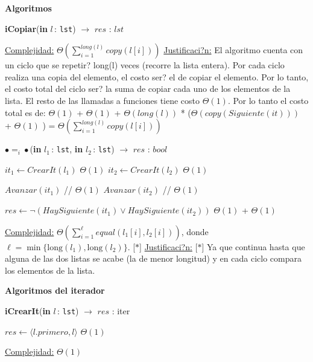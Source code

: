 \documentclass[a4paper,10pt]{article}
\let\TipoVariable=\texttt
\let\ModificadorArgumento=\textbf
\newcommand{\In}[2]{\ModificadorArgumento{in} \ensuremath{#1}\,: \TipoVariable{#2}\xspace}
\newenvironment{Algoritmos}{%
  \vspace*{2ex}%
  \noindent\textbf{\Large Algoritmos}%
  \vspace*{2ex}%
}{}
\newcommand{\Titulo}[1]{
  \vspace*{1ex}\par\noindent\textbf{\large #1}\par
}
\begin{document}
\begin{Algoritmos}
\begin{algorithm}[H]{\textbf{iCopiar}(\In{l}{lst}) $\to$ $res$ : $lst$}
\begin{algorithmic}[1]
		\medskip
		\Statex \underline{Complejidad:} $\Theta\left(\sum_{i=1}^{long(l)}copy({l[i]})\right)$
		\Statex \underline{Justificaci?n:} El algoritmo cuenta con un ciclo que se repetir? long(l) veces (recorre la lista entera). Por cada ciclo realiza una copia del elemento, el costo ser? el de copiar el elemento. Por lo tanto, el costo total del ciclo ser? la suma de copiar cada uno de los elementos de la lista. El resto de las llamadas a funciones tiene costo $\Theta(1)$. Por lo tanto el costo total es de: $\Theta(1)$  + $\Theta(1)$ + $\Theta(long(l))$ * ($\Theta(copy(Siguiente(it)))$ + $\Theta(1)$ ) = $\Theta\left(\sum_{i=1}^{long(l)}copy({l[i]})\right)$
    \end{algorithmic}
\end{algorithm}	

	
\begin{algorithm}[H]{\textbf{$\bullet =_i \bullet$}(\In{l_1}{lst}, \In{l_2}{lst}) $\to$ $res$ : $bool$}
	\begin{algorithmic}[1]
			\State $it_1 \gets CrearIt(l_1)$	\Comment $\Theta(1)$
			\State $it_2 \gets CrearIt(l_2)$ 	\Comment $\Theta(1)$
			
			  \Comment [$\ast$]
			 	\State $Avanzar(it_1)$ // $\Theta(1)$
				\State $Avanzar(it_2)$	// $\Theta(1)$
			\EndWhile
			
			\State $res \gets \neg(HaySiguiente(it_1) \lor HaySiguiente(it_2))$	\Comment $\Theta(1)$ + $\Theta(1)$
    	
		\medskip
		\Statex \underline{Complejidad:} $\displaystyle\Theta\left(\sum_{i=1}^{\ell}{equal(l_1[i],l_2[i])}\right)$, donde $\ell = \min\{\text{long}(l_1),\text{long}(l_2)\}$. [$\ast$]
		\Statex \underline{Justificaci?n:} [$\ast$] Ya que continua hasta que alguna de las dos listas se acabe (la de menor longitud) y en cada ciclo compara los elementos de la lista.
    \end{algorithmic}
\end{algorithm}


\Titulo{Algoritmos del iterador}	
 
\begin{algorithm}[H]
	\begin{algorithmic}[1]
		\State \textbf{iCrearIt}(\In{l}{lst}) $\to$ $res$ : iter
		
			\State $res \gets \langle l.primero, l \rangle$ 	\Comment $\Theta(1)$
    	
		\medskip
		\Statex \underline{Complejidad:} $\Theta(1)$
    \end{algorithmic}
\end{algorithm}	


\end{Algoritmos}
\end{document}
